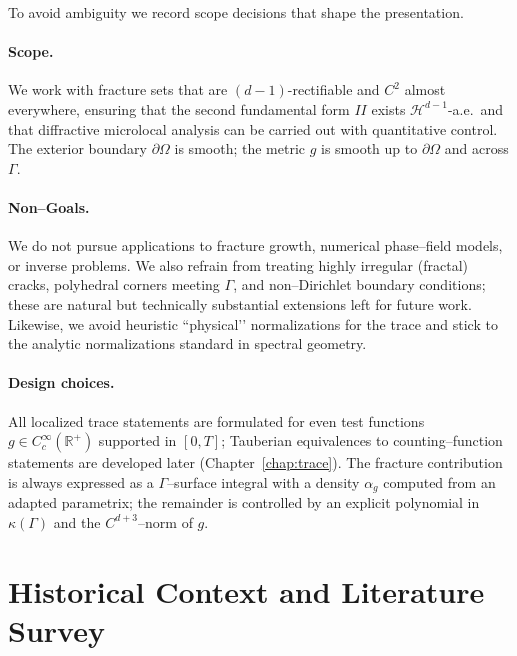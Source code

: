 To avoid ambiguity we record scope decisions that shape the presentation.

\paragraph{Scope.}  
We work with fracture sets that are $(d\!-\!1)$-rectifiable and $C^2$ almost 
everywhere, ensuring that the second fundamental form $II$ exists 
$\mathcal H^{d-1}$-a.e.\ and that diffractive microlocal analysis can be carried 
out with quantitative control. The exterior boundary $\partial\Omega$ is 
smooth; the metric $g$ is smooth up to $\partial\Omega$ and across $\Gamma$.

\paragraph{Non–Goals.}  
We do not pursue applications to fracture growth, numerical phase–field models, 
or inverse problems. We also refrain from treating highly irregular (fractal) 
cracks, polyhedral corners meeting $\Gamma$, and non–Dirichlet boundary 
conditions; these are natural but technically substantial extensions left for 
future work. Likewise, we avoid heuristic “physical’’ normalizations for the 
trace and stick to the analytic normalizations standard in spectral geometry.

\paragraph{Design choices.}  
All localized trace statements are formulated for even test functions 
$g\in C_c^\infty(\mathbb R^+)$ supported in $[0,T]$; Tauberian equivalences to 
counting–function statements are developed later (Chapter~\ref{chap:trace}). 
The fracture contribution is always expressed as a $\Gamma$–surface integral 
with a density $\alpha_g$ computed from an adapted parametrix; the remainder is 
controlled by an explicit polynomial in $\kappa(\Gamma)$ and the $C^{d+3}$–norm 
of $g$.


\section{Historical Context and Literature Survey}

